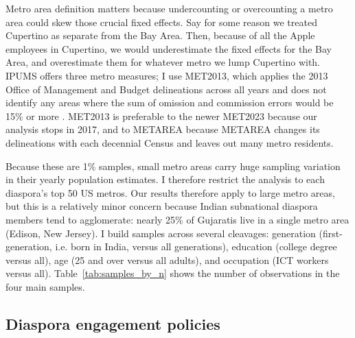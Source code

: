 \documentclass[12pt]{article}
\begin{document}
Metro area definition matters because undercounting or overcounting a metro area could skew those crucial fixed effects. Say for some reason we treated Cupertino as separate from the Bay Area. Then, because of all the Apple employees in Cupertino, we would underestimate the fixed effects for the Bay Area, and overestimate them for whatever metro we lump Cupertino with. IPUMS offers three metro measures; I use MET2013, which applies the 2013 Office of Management and Budget delineations across all years and does not identify any areas where the sum of omission and commission errors would be 15\% or more \citep{noauthor_ipums_nodate}. MET2013 is preferable to the newer MET2023 because our analysis stops in 2017, and to METAREA because METAREA changes its delineations with each decennial Census and leaves out many metro residents.

Because these are 1\% samples, small metro areas carry huge sampling variation in their yearly population estimates. I therefore restrict the analysis to each diaspora's top 50 US metros. Our results therefore apply to large metro areas, but this is a relatively minor concern because Indian subnational diaspora members tend to agglomerate: nearly 25\% of Gujaratis live in a single metro area (Edison, New Jersey). I build samples across several cleavages: generation (first-generation, i.e. born in India, versus all generations), education (college degree versus all), age (25 and over versus all adults), and occupation (ICT workers versus all). Table~\ref{tab:samples_by_n} shows the number of observations in the four main samples.



\subsection{Diaspora engagement policies}
\end{document}
